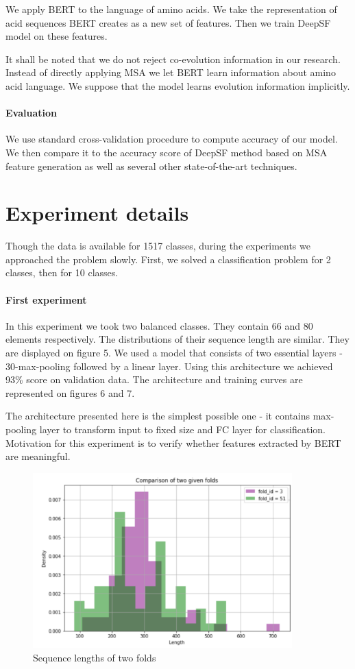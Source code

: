\documentclass[12pt, twoside]{article}
\begin{document}
We apply BERT to the language of amino acids. We take the representation of acid sequences BERT creates as a new set of features. Then we train DeepSF model on these features.

It shall be noted that we do not reject co-evolution information in our research. Instead of directly applying MSA we let BERT learn information about amino acid language. We suppose that the model learns evolution information implicitly.

\paragraph{Evaluation}
\noindent
We use standard cross-validation procedure to compute accuracy of our model. We then compare it to the accuracy score of DeepSF method based on MSA feature generation as well as several other state-of-the-art techniques. 

\section{Experiment details}
Though the data is available for 1517 classes, during the experiments we approached the problem slowly. First, we solved a classification problem for 2 classes, then for 10 classes.

\paragraph{First experiment}
\noindent In this experiment we took two balanced classes. They contain 66 and 80 elements respectively. The distributions of their sequence length are similar. They are displayed on figure 5. We used a model that consists of two essential layers - 30-max-pooling followed by a linear layer. Using this architecture we achieved 93\% score on validation data. The architecture and training curves are represented on figures 6 and 7.  

The architecture presented here is the simplest possible one - it contains max-pooling layer to transform input to fixed size and FC layer for classification. Motivation for this experiment is to verify whether features extracted by BERT are meaningful.

\begin{figure}[htp]
    \centering
    \includegraphics[width=10cm]{figures/figure5.pdf}
    \caption{Sequence lengths of two folds}
\end{figure}
\end{document}
